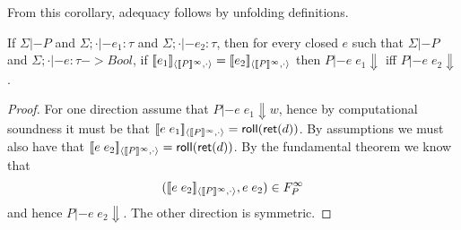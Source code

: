\documentclass[preprint,nocopyrightspace]{sigplanconf}
\begin{document}
From this corollary, adequacy follows by unfolding definitions.

\begin{corollary}
If $\Sigma |- P$ and $\Sigma;\cdot |- e_1 : \tau$ and $\Sigma;\cdot |- e_2 : \tau$, 
then for every closed $e$ such that $\Sigma |- P$ and $\Sigma;\cdot |- e : \tau -> Bool$,
if $\interp{e_1}{\dbrace{P}^\infty}{\cdot} = \interp{e_2}{\dbrace{P}^\infty}{\cdot}$ then  
$P |- e\;e_1 \Downarrow$ iff $P |- e\;e_2 \Downarrow$. 
\end{corollary}
\begin{proof}
For one direction assume that $P |- e\;e_1 \Downarrow w$, hence by computational soundness it must be that 
$[\![e\;e_1]\!]_{\langle {[\![P]\!]^\infty},{\cdot}\rangle} = \mathsf{roll}(\mathsf{ret}(d))$. By assumptions we must also 
have that $[\![e\;e_2]\!]_{\langle {[\![P]\!]^\infty},{\cdot}\rangle} = \mathsf{roll}(\mathsf{ret}(d))$. By the fundamental theorem 
we know that 
\[ ([\![e\;e_2]\!]_{\langle {[\![P]\!]^\infty},{\cdot}\rangle}, e\;e_2) \in F_{P}^\infty \] 
and hence $P |- e\;e_2 \Downarrow$. The other direction is symmetric.
\end{proof}

\end{document}
